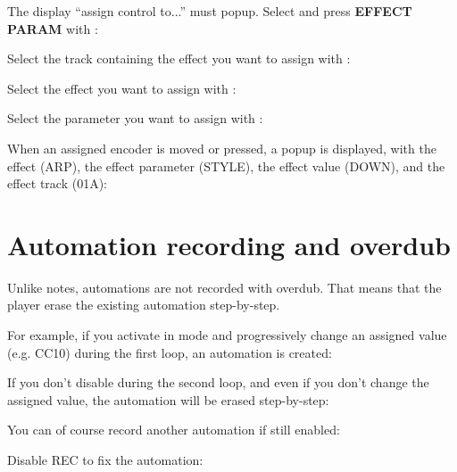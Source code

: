 The display ``assign control to...'' must popup. Select and press \textbf{EFFECT PARAM} with \encodericon{}:


Select the track containing the effect you want to assign with \encodericon{}:


Select the effect you want to assign with \encodericon{}:


Select the parameter you want to assign with \encodericon{}:



When an assigned encoder is moved or pressed, a popup is displayed, with the effect (ARP), the effect parameter (STYLE), the effect value (DOWN), and the effect track (01A):


\section{Automation recording and overdub}

Unlike notes, automations are not recorded with overdub. That means that the player erase the existing automation step-by-step.

For example, if you activate  in  mode and progressively change an assigned value (e.g. CC10) during the first loop, an automation is created:


If you don't disable  during the second loop, and even if you don't change the assigned value, the automation will be erased step-by-step:


You can of course record another automation if  still enabled:


Disable REC  to fix the automation:


